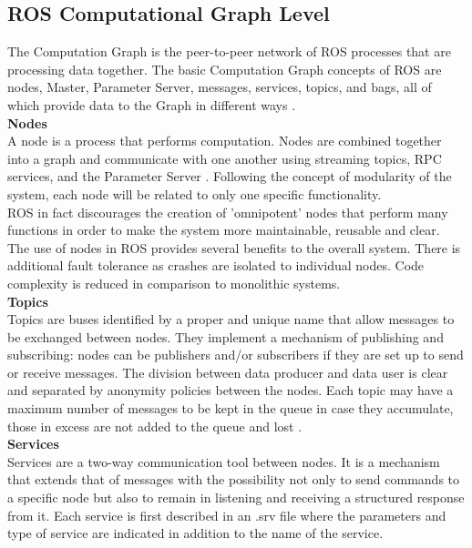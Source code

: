 \subsection{ROS Computational Graph Level}
The Computation Graph is the peer-to-peer network of ROS processes that are processing data together. The basic Computation Graph concepts of ROS are nodes, Master, Parameter Server, messages, services, topics, and bags, all of which provide data to the Graph in different ways \citet{rosconcepts}.\\
\newline
\textbf{Nodes}\\
A node is a process that performs computation. Nodes are combined together into a graph and communicate with one another using streaming topics, RPC services, and the Parameter Server \citet{rosnodes}. Following the concept of modularity of the system, each node will be related to only one specific functionality.\\ ROS in fact
discourages the creation of 'omnipotent' nodes that perform many functions in order to make the system more maintainable, reusable and clear.\\
The use of nodes in ROS provides several benefits to the overall system. There is additional fault tolerance as crashes are isolated to individual nodes. Code complexity is reduced in comparison to monolithic systems.\\
\newline
\textbf{Topics}\\
Topics are buses identified by a proper and unique name that allow messages to be exchanged between nodes. They implement a mechanism
of publishing and subscribing: nodes can be publishers and/or subscribers if they are set up to send or receive messages. The division between
data producer and data user is clear and separated by anonymity policies
between the nodes. Each topic may have a maximum number of messages to be kept
in the queue in case they accumulate, those in excess are not added to the queue and lost \citet{rostopics}.\\
\newline
\textbf{Services}\\
Services are a two-way communication tool between nodes. It is a mechanism that extends that of messages with the possibility
not only to send commands to a specific node but also to remain in
listening and receiving a structured response from it. Each service is
first described in an .srv file where the parameters and type of service are indicated in addition to the name of the service.

